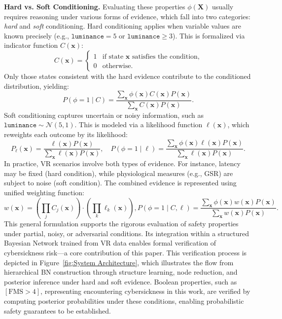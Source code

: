 \documentclass{vgtc}                          %
\begin{document}
\textbf{Hard vs. Soft Conditioning.} %
Evaluating these properties $\phi(\mathbf{X})$ usually requires reasoning under various forms of evidence, which fall into two categories: \emph{hard} and \emph{soft} conditioning. Hard conditioning applies when variable values are known precisely (e.g., \(\texttt{luminance} = 5\) or \(\texttt{luminance} \geq 3\)). This is formalized via indicator function \(C(\mathbf{x})\):
\[
C(\mathbf{x}) = \begin{cases}
1 & \text{if state } \mathbf{x} \text{ satisfies the condition,} \\
0 & \text{otherwise.}
\end{cases}
\]
Only those states consistent with the hard evidence contribute to the conditioned distribution, yielding:
\[
P(\phi = 1 \mid C) = 
\frac{\sum_{\mathbf{x}} \phi(\mathbf{x}) C(\mathbf{x}) P(\mathbf{x})}
{\sum_{\mathbf{x}} C(\mathbf{x}) P(\mathbf{x})}.
\]
Soft conditioning captures uncertain or noisy information, such as \(\texttt{luminance} \sim \mathcal{N}(5,1)\). This is modeled via a likelihood function \(\ell(\mathbf{x})\), which reweights each outcome by its likelihood:
\[
P_\ell(\mathbf{x}) = 
\frac{\ell(\mathbf{x}) P(\mathbf{x})}{\sum_{\mathbf{x}} \ell(\mathbf{x}) P(\mathbf{x})}, \quad
P(\phi = 1 \mid \ell) = 
\frac{\sum_{\mathbf{x}} \phi(\mathbf{x}) \ell(\mathbf{x}) P(\mathbf{x})}
{\sum_{\mathbf{x}} \ell(\mathbf{x}) P(\mathbf{x})}.
\]
In practice, VR scenarios involve both types of evidence. For instance, latency may be fixed (hard condition), while physiological measures (e.g., GSR) are subject to noise (soft condition). The combined evidence is represented using unified weighting function:
\[
\!\!\!w(\mathbf{x})\! =\! \left(\! \prod_{j} C_j(\mathbf{x})\! \right)\! \cdot \!\left(\! \prod_{k} \ell_k(\mathbf{x})\! \right),
P(\phi = 1 \mid C,\ell) = 
\frac{\sum_{\mathbf{x}} \phi(\mathbf{x}) w(\mathbf{x}) P(\mathbf{x})}
{\sum_{\mathbf{x}} w(\mathbf{x}) P(\mathbf{x})}.
\]
This general formulation supports the rigorous evaluation of safety properties under partial, noisy, or adversarial conditions. Its integration within a structured Bayesian Network trained from VR data enables formal verification of cybersickness risk—a core contribution of this paper.
This verification process is depicted in Figure~\ref{fig:System Architecture}, which illustrates the flow from hierarchical BN construction through structure learning, node reduction, and posterior inference under hard and soft evidence. Boolean properties, such as \([\mathrm{FMS} > 4]\), representing encountering cybersickness in this work, are verified by computing posterior probabilities under these conditions, enabling probabilistic safety guarantees to be established.
\end{document}
